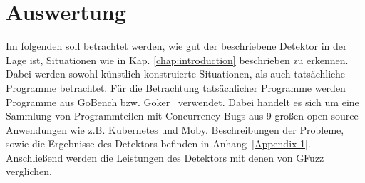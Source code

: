\chapter{Auswertung}\label{Chap:Eval}
Im folgenden soll betrachtet werden, wie gut der beschriebene Detektor 
in der Lage ist, Situationen wie in Kap. \ref{chap:introduction} 
beschrieben zu erkennen. Dabei werden sowohl künstlich konstruierte 
Situationen, als auch tatsächliche Programme betrachtet. Für die Betrachtung 
tatsächlicher Programme werden Programme aus GoBench bzw. Goker~\cite{gobench}
verwendet. Dabei handelt es sich um eine Sammlung von Programmteilen mit 
Concurrency-Bugs aus 9 
großen open-source Anwendungen wie z.B. Kubernetes und Moby. 
Beschreibungen der Probleme, sowie die Ergebnisse des Detektors befinden in 
Anhang~\ref{Appendix-1}.\\
Anschließend werden die Leistungen des Detektors mit denen von GFuzz verglichen.

